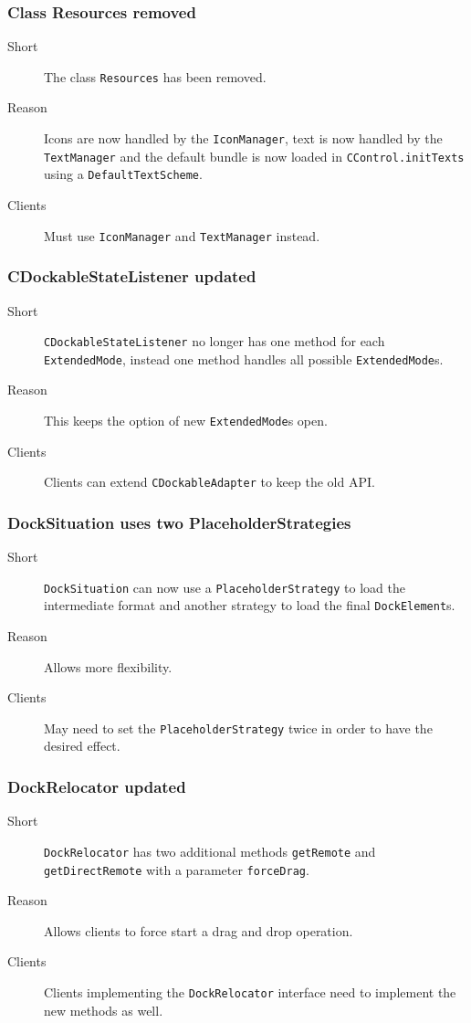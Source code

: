\documentclass[a4paper,10pt]{article}
\newcommand{\src}[1]{\lstinline[basicstyle=\normalsize\ttfamily,keywordstyle=\normalsize\ttfamily,identifierstyle=\normalsize\ttfamily]|#1|}
\newcommand{\short}{\item[Short]}
\newcommand{\why}{\item[Reason]}
\newcommand{\clients}{\item[Clients]}
\begin{document}
\subsubsection{Class Resources removed}
\begin{description}
 \short The class \src{Resources} has been removed.
 \why Icons are now handled by the \src{IconManager}, text is now handled by the \src{TextManager} and the default bundle is now loaded in \src{CControl.initTexts} using a \src{DefaultTextScheme}.
 \clients Must use \src{IconManager} and \src{TextManager} instead.
\end{description}

\subsubsection{CDockableStateListener updated}
\begin{description}
 \short \src{CDockableStateListener} no longer has one method for each \linebreak \src{ExtendedMode}, instead one method handles all possible \src{ExtendedMode}s.
 \why This keeps the option of new \src{ExtendedMode}s open.
 \clients Clients can extend \src{CDockableAdapter} to keep the old API.
\end{description}

\subsubsection{DockSituation uses two PlaceholderStrategies}
\begin{description}
 \short \src{DockSituation} can now use a \src{PlaceholderStrategy} to load the intermediate format and another strategy to load the final \src{DockElement}s.
 \why Allows more flexibility.
 \clients May need to set the \src{PlaceholderStrategy} twice in order to have the desired effect.
\end{description}

\subsubsection{DockRelocator updated}
\begin{description}
 \short \src{DockRelocator} has two additional methods \src{getRemote} and \linebreak \src{getDirectRemote} with a parameter \src{forceDrag}.
 \why Allows clients to force start a drag and drop operation.
 \clients Clients implementing the \src{DockRelocator} interface need to implement the new methods as well.
\end{description}
\end{document}
